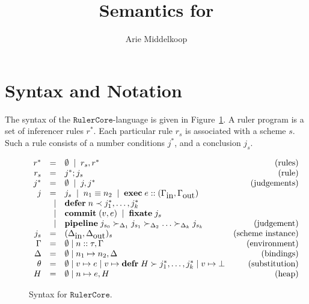 \documentclass[10pt]{article}
\title{Semantics for \RulerCore}
\author{Arie Middelkoop}
\newcommand\Rules{r^*}
\newcommand\Rule[1]{r_{#1}}
\newcommand\Judgements{j^*}
\newcommand\Judgement{j}
\newcommand\Judgescheme[1]{j_{#1}}
\newcommand\Bindings{\Delta}
\newcommand\Env{\Gamma}
\newcommand\Type{\tau}
\newcommand\Substitution{\theta}
\newcommand\Heap{H}
\newcommand\Execution{\mathbf{exec}\;}
\newcommand\Defer{\mathbf{defer}\;}
\newcommand\Fixate{\mathbf{fixate}\;}
\newcommand\Pipeline{\mathbf{pipeline}\;}
\newcommand\Deferred{\mathbf{defr}\;}
\newcommand\Commit{\mathbf{commit}\;}
\newcommand\RulerCore{\ensuremath{\mathtt{Ruler Core}}}
\begin{document}
\maketitle

\section{Syntax and Notation}

The syntax of the \RulerCore-language is given in
Figure~\ref{fig:ruler-core-syntax}. A ruler program is a set of inferencer
rules $\Rules$. Each particular rule $\Rule{s}$ is associated with a scheme $s$.
Such a rule consists of a number conditions $\Judgements$, and a conclusion
$\Judgescheme{s}$.

\begin{figure}[htp]
\begin{displaymath} 
  \begin{array}[t]{rrlr}
    \Rules           &    =    &   \emptyset  \;\mid\;  \Rule{s}, \Rules            & (\mbox{rules})\\
    \Rule{s}         &    =    &   \Judgements ; \Judgescheme{s}                & (\mbox{rule})\\
    \Judgements      &    =    &   \emptyset  \;\mid\;  \Judgement, \Judgements     & (\mbox{judgements})\\
    \Judgement       &    =    &   \Judgescheme{s} \;\mid\; n_1 \equiv n_2 \;\mid\;
                                   \Execution e :: (\Env_{\mbox{in}},\Env_{\mbox{out}})\\
                     &    \mid &   \Defer n \prec \Judgements_1, \ldots, \Judgements_k\\
                     &    \mid &   \Commit(v,e) \;\mid\; \Fixate \Judgescheme{s}\\
                     &    \mid &   \Pipeline \Judgescheme{s_0} \succ_{\Bindings_1} \Judgescheme{s_1} \succ_{\Bindings_2} \ldots \succ_{\Bindings_k} \Judgescheme{s_k} & (\mbox{judgement})\\
    \Judgescheme{s}  &    =    &   (\Bindings_{\mbox{in}}, \Bindings_{\mbox{out}})_s   & (\mbox{scheme instance})\\
    \Env             &    =    &   \emptyset  \mid  n :: \Type, \Env            & (\mbox{environment})\\
    \Bindings        &    =    &   \emptyset  \mid  n_1 \mapsto n_2, \Bindings  & (\mbox{bindings})\\
    \Substitution    &    =    &   \emptyset  \mid  v \mapsto e \mid  v \mapsto \Deferred \Heap \succ \Judgements_1, \ldots, \Judgements_k \mid v \mapsto \bot   & (\mbox{substitution})\\
    \Heap            &    =    &   \emptyset  \mid  n \mapsto e, \Heap          & (\mbox{heap})\\
  \end{array}
\end{displaymath}
\caption{Syntax for \RulerCore.}
\label{fig:ruler-core-syntax}
\end{figure}
\end{document}

